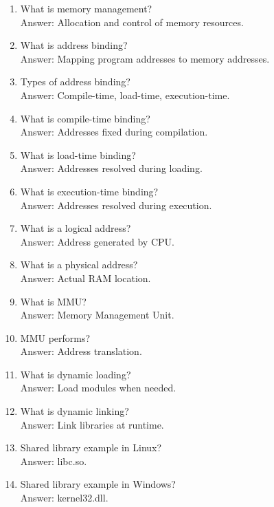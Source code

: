 \begin{enumerate}
\item What is memory management?\\
Answer: Allocation and control of memory resources.

\item What is address binding?\\
Answer: Mapping program addresses to memory addresses.

\item Types of address binding?\\
Answer: Compile-time, load-time, execution-time.

\item What is compile-time binding?\\
Answer: Addresses fixed during compilation.

\item What is load-time binding?\\
Answer: Addresses resolved during loading.

\item What is execution-time binding?\\
Answer: Addresses resolved during execution.

\item What is a logical address?\\
Answer: Address generated by CPU.

\item What is a physical address?\\
Answer: Actual RAM location.

\item What is MMU?\\
Answer: Memory Management Unit.

\item MMU performs?\\
Answer: Address translation.

\item What is dynamic loading?\\
Answer: Load modules when needed.

\item What is dynamic linking?\\
Answer: Link libraries at runtime.

\item Shared library example in Linux?\\
Answer: libc.so.

\item Shared library example in Windows?\\
Answer: kernel32.dll.


\end{enumerate}
